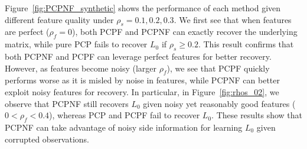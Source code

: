 \documentclass[twoside,11pt]{article}
\def\realL{L_0}
\begin{document}
Figure~\ref{fig:PCPNF_synthetic} shows the performance of each method
given different feature quality under $\rho_s = 0.1, 0.2, 0.3$.
We first see that when features are perfect ($\rho_f = 0$),
both PCPF and PCPNF can exactly recover the underlying matrix,
while pure PCP fails to recover $\realL$ if $\rho_s \geq 0.2$.
This result confirms that both PCPNF and PCPF
can leverage perfect features for better recovery.
However, as features become noisy (larger $\rho_f$), we see that
PCPF quickly performs worse as it is misled by noise in features,
while PCPNF can better exploit noisy features for recovery.
In particular, in Figure~\ref{fig:rhos_02},
we observe that PCPNF still recovers $\realL$ given noisy yet
reasonably good features ($0 < \rho_f < 0.4$), whereas
PCP and PCPF fail to recover $\realL$.
These results show that
PCPNF can take advantage of noisy
side information for learning $\realL$ given corrupted observations.
\end{document}
